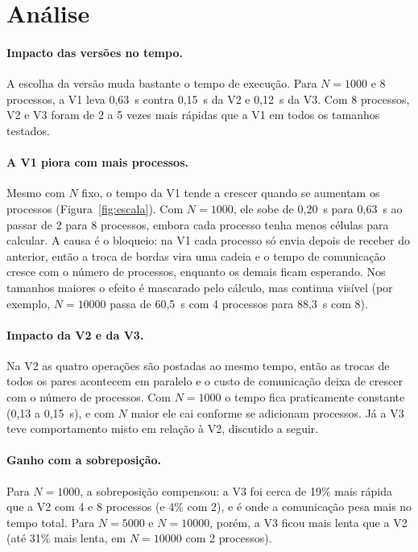 \documentclass[a4paper,12pt]{article}
\begin{document}
\section{Análise}

\paragraph{Impacto das versões no tempo.}
A escolha da versão muda bastante o tempo de execução. Para $N=1000$ e 8
processos, a V1 leva 0,63~s contra 0,15~s da V2 e 0,12~s da V3. Com 8
processos, V2 e V3 foram de 2 a 5 vezes mais rápidas que a V1 em todos os
tamanhos testados.

\paragraph{A V1 piora com mais processos.}
Mesmo com $N$ fixo, o tempo da V1 tende a crescer quando se aumentam os
processos (Figura~\ref{fig:escala}). Com $N=1000$, ele sobe de 0,20~s para
0,63~s ao passar de 2 para 8 processos, embora cada processo tenha menos
células para calcular. A causa é o bloqueio: na V1 cada processo só envia
depois de receber do anterior, então a troca de bordas vira uma cadeia e o
tempo de comunicação cresce com o número de processos, enquanto os demais
ficam esperando. Nos tamanhos maiores o efeito é mascarado pelo cálculo, mas
continua visível (por exemplo, $N=10000$ passa de 60,5~s com 4 processos para
88,3~s com 8).

\paragraph{Impacto da V2 e da V3.}
Na V2 as quatro operações são postadas ao mesmo tempo, então as trocas de
todos os pares acontecem em paralelo e o custo de comunicação deixa de
crescer com o número de processos. Com $N=1000$ o tempo fica praticamente
constante (0,13 a 0,15~s), e com $N$ maior ele cai conforme se adicionam
processos. Já a V3 teve comportamento misto em relação à V2, discutido a
seguir.

\paragraph{Ganho com a sobreposição.}
Para $N=1000$, a sobreposição compensou: a V3 foi cerca de 19\% mais rápida
que a V2 com 4 e 8 processos (e 4\% com 2), e é onde a comunicação pesa mais
no tempo total. Para $N=5000$ e $N=10000$, porém, a V3 ficou mais lenta que
a V2 (até 31\% mais lenta, em $N=10000$ com 2 processos). 
\end{document}
